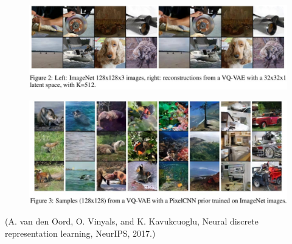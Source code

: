 \documentclass{report}
\begin{document}
\begin{concept}[11.23][VQ-VAE]
    \begin{figure}[H]
        \centering
        \includegraphics[width=1.0\textwidth]{.././assets/11.8.png}
    \end{figure}

    \begin{figure}[H]
        \centering
        \includegraphics[width=1.0\textwidth]{.././assets/11.9.png}
    \end{figure}

    (A. van den Oord, O. Vinyals, and K. Kavukcuoglu, Neural discrete representation learning, NeurIPS, 2017.)
\end{concept}
\end{document}
